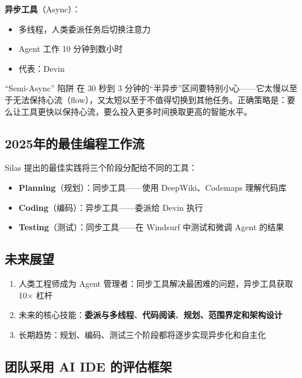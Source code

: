 \documentclass[a4paper]{article}
\begin{document}
\textbf{异步工具}（Async）：
\begin{itemize}
    \item 多线程，人类委派任务后切换注意力
    \item Agent 工作 10 分钟到数小时
    \item 代表：Devin
\end{itemize}

\begin{warningbox}{``Semi-Async'' 陷阱}
在 30 秒到 3 分钟的``半异步''区间要特别小心——它太慢以至于无法保持心流（flow），又太短以至于不值得切换到其他任务。正确策略是：要么让工具更快以保持心流，要么投入更多时间换取更高的智能水平。
\end{warningbox}

\subsection{2025年的最佳编程工作流}

Silas 提出的最佳实践将三个阶段分配给不同的工具：

\begin{itemize}
    \item \textbf{Planning}（规划）：同步工具——使用 DeepWiki、Codemaps 理解代码库
    \item \textbf{Coding}（编码）：异步工具——委派给 Devin 执行
    \item \textbf{Testing}（测试）：同步工具——在 Windsurf 中测试和微调 Agent 的结果
\end{itemize}

\subsection{未来展望}

\begin{enumerate}
    \item 人类工程师成为 Agent 管理者：同步工具解决最困难的问题，异步工具获取 10$\times$ 杠杆
    \item 未来的核心技能：\textbf{委派与多线程}、\textbf{代码阅读}、\textbf{规划、范围界定和架构设计}
    \item 长期趋势：规划、编码、测试三个阶段都将逐步实现异步化和自主化
\end{enumerate}

\subsection{团队采用 AI IDE 的评估框架}
\end{document}
